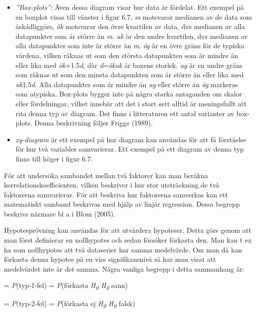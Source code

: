 \begin{itemize}
\item
  \emph{''Box-plots'':} Även dessa diagram visar hur data är fördelat.
  Ett exempel på en boxplot visas till vänster i figur 6.7. \emph{m}
  motsvarar medianen av de data som åskådliggörs, \emph{ök} motsvarar
  den övre kvartilen av data, dvs medianen av alla datapunkter som är
  större än \emph{m}. \emph{uk} är den undre kvartilen, dvs medianen av
  alla datapunkter som inte är större än \emph{m}. \emph{ög} är en övre
  gräns för de typiska värdena, vilken räknas ut som den största
  datapunkten som är mindre än eller lika med \emph{ök}+1.5\emph{d}, där
  \emph{d}=\emph{ökuk} är boxens storlek. \emph{ug} är en undre gräns
  som räknas ut som den minsta datapunkten som är större än eller lika
  med \emph{uk}1.5\emph{d}. Alla datapunkter som är mindre än \emph{ug}
  eller större än \emph{ög} markeras som atypiska. Box-plots bygger inte
  på några starka antaganden om skalor eller fördelningar, vilket
  innebär att det i stort sett alltid är meningsfullt att rita denna typ
  av diagram. Det finns i litteraturen ett antal varianter av box-plots.
  Denna beskrivning följer Frigge (1989).
\item
  \emph{xy-diagram} är ett exempel på hur diagram kan användas för att
  få förståelse för hur två variabler samvarierar. Ett exempel på ett
  diagram av denna typ finns till höger i figur 6.7.
\end{itemize}

För att undersöka sambandet mellan två faktorer kan man beräkna
korrelationskoefficienten, vilken beskriver i hur stor utsträckning de
två faktorerna samvarierar. För att beskriva hur faktorerna samverkas
kan ett matematiskt samband beskrivas med hjälp av linjär regression.
Dessa begrepp beskrivs närmare bl a i Blom (2005).

Hypotesprövning kan användas för att utvärdera hypoteser. Detta görs
genom att man först definierar en nollhypotes och sedan försöker
förkasta den. Man kan t ex ha som nollhypotes att två dataserier har
samma medelvärde. Om man då kan förkasta denna hypotes på en viss
signifikansnivå så har man visat att medelvärdet inte är det samma.
Några vanliga begrepp i detta sammanhang är:

= \emph{P}(typ-1-fel) = \emph{P}(förkasta \emph{H\textsubscript{0}}
\textbar{} \emph{H\textsubscript{0}} sann)

= \emph{P}(typ-2-fel) = \emph{P}(förkasta ej \emph{H\textsubscript{0}}
\textbar{} \emph{H\textsubscript{0}} falsk)

